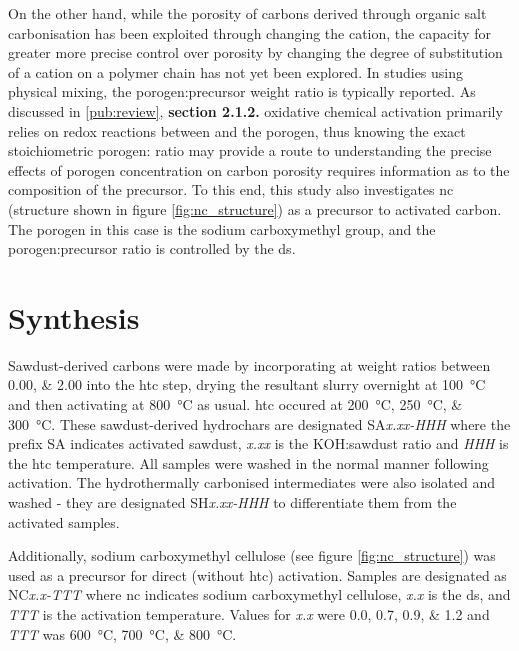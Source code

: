 On the other hand, while the porosity of carbons derived through organic salt carbonisation has been exploited through changing the cation,\citep{Sevilla2013general, Tsumura2014Structure, Ferrero2015Mesoporous, Ferrero2016Efficient, Fuertes2015Hierarchical, Roberts2015Hierarchically, Yadav20123D, Yang2018Spontaneous} the capacity for greater more precise control over porosity by changing the degree of substitution of a cation on a polymer chain has not yet been explored. In studies using physical mixing, the \gls{porogen}:precursor weight ratio is typically reported.\citep{Altwala2020Predictable, Adeniran2015Compactivation, Blankenship2017Cigarette, Sevilla2016green, Ludwinowicz2015Potassium, Deng2015Inspired, Alhamed2015Preparation, Hu2003simple} As discussed in \ref{pub:review}, \textbf{section 2.1.2.} oxidative chemical activation primarily relies on redox reactions between  and the \gls{porogen}, thus knowing the exact stoichiometric  \gls{porogen}: ratio may provide a route to understanding the precise effects of \gls{porogen} concentration on carbon porosity requires information as to the composition of the precursor. To this end, this study also investigates \acrfull{nc} (structure shown in figure \ref{fig:nc_structure}) as a precursor to activated carbon. The \gls{porogen} in this case is the sodium carboxymethyl group, and the \gls{porogen}:precursor ratio is controlled by the \acrfull{ds}.

\section{Synthesis}
Sawdust-derived carbons were made by incorporating  at weight ratios between \numlist{0.00;2.00} into the \gls{htc} step, drying the resultant slurry overnight at \qty{100}{\degreeCelsius} and then activating at \qty{800}{\degreeCelsius} as usual. \Gls{htc} occured at \qtylist[list-units=single]{200;250;300}{\degreeCelsius}. These sawdust-derived \glspl{hydrochar} are designated SA\textit{x.xx-HHH} where the prefix SA indicates activated sawdust, \textit{x.xx} is the KOH:sawdust ratio and \textit{HHH} is the \gls{htc} temperature. All samples were washed in the normal manner following activation. The hydrothermally carbonised intermediates were also isolated and washed - they are designated  SH\textit{x.xx-HHH} to differentiate them from the activated samples.

Additionally, sodium carboxymethyl cellulose (see figure \ref{fig:nc_structure}) was used as a precursor for direct (without \gls{htc}) activation.  Samples are designated as NC\textit{x.x-TTT} where \acrshort{nc} indicates sodium carboxymethyl cellulose, \textit{x.x} is the \acrshort{ds}, and \textit{TTT} is the activation temperature. Values for \textit{x.x} were \numlist{0.0;0.7;0.9;1.2} and \textit{TTT} was \qtylist[list-units=single]{600;700;800}{\degreeCelsius}.

